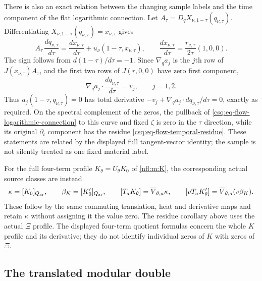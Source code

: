 There is also an exact relation between the changing sample labels
and the time component of the flat logarithmic connection.
Let $A_\tau=D_qX_{\nu,1-\tau}(q_{\nu,\tau})$. Differentiating
$X_{\nu,1-\tau}(q_{\nu,\tau})=x_{\nu,\tau}$ gives
\[
 A_\tau\,\frac{dq_{\nu,\tau}}{d\tau}
 =\frac{dx_{\nu,\tau}}{d\tau}
       +u_\nu(1-\tau,x_{\nu,\tau}),\qquad
 \frac{dx_{\nu,\tau}}{d\tau}
       =\frac{r_{\nu,\tau}}{2\tau}(1,0,0).
\]
The sign follows from $d(1-\tau)/d\tau=-1$.
Since $\nabla_q a_j$ is the $j$th row of $J(x_{\nu,\tau})A_\tau$,
and the first two rows of $J(r,0,0)$ have zero first component,
\[
 \nabla_q a_j\cdot\frac{dq_{\nu,\tau}}{d\tau}=v_j,\qquad j=1,2.
\]
Thus $a_j(1-\tau,q_{\nu,\tau})=0$ has total derivative
$-v_j+\nabla_q a_j\cdot dq_{\nu,\tau}/d\tau=0$, exactly as required.
On the spectral complement of the zeros, the pullback of
\eqref{csq:eq-flow-logarithmic-connection} to this curve and fixed
$\zeta$ is zero in the $\tau$ direction, while its original
$\partial_t$ component has the residue
\eqref{csq:eq-flow-temporal-residue}. These statements are related
by the displayed full tangent-vector identity; the sample is not
silently treated as one fixed material label.

For the full four-term profile $K_\theta=U_\theta K_0$ of
\eqref{nfl:m:K}, the corresponding
actual source classes are instead
\[
 \kappa=[K_0]_{Q_{\rm ar}},\qquad \beta_K=[K_0']_{Q_{\rm ar}},\qquad
 [T_aK_\theta]=\overline V_{\theta,a}\kappa,\qquad
 [vT_aK_\theta']=\overline V_{\theta,a}(v\beta_K).
\]
These follow by the same commuting translation, heat and derivative
maps and retain $\kappa$ without assigning it the value zero.
The residue corollary above uses the actual $\Xi$ profile.
The displayed four-term quotient formulas concern the whole $K$
profile and its derivative; they do not identify individual zeros
of $K$ with zeros of $\Xi$.

\subsection{The translated modular double}

